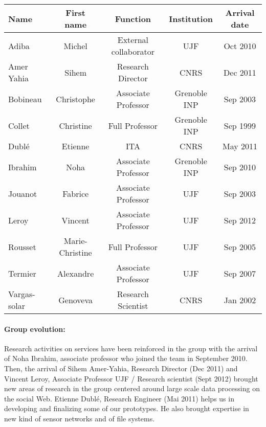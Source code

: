 
\begin{center}\begin{tabular}{|p{2.5cm}|*{4}{c|}}
\hline 
Name & First name & Function & Institution & Arrival date\\\hline \hline %
Adiba & Michel & External collaborator  & UJF & Oct 2010\\\hline
Amer Yahia & Sihem & Research Director & CNRS & Dec 2011  \\\hline
Bobineau & Christophe & Associate Professor & Grenoble INP & Sep 2003 \\\hline
Collet & Christine & Full Professor & Grenoble INP & Sep 1999 \\\hline
Dubl{\'e} & Etienne & ITA  & CNRS & May 2011\\\hline
Ibrahim & Noha & Associate Professor & Grenoble INP & Sep 2010  \\\hline
Jouanot & Fabrice & Associate Professor & UJF & Sep 2003 \\\hline
Leroy & Vincent & Associate Professor & UJF & Sep 2012 \\\hline
Rousset & Marie-Christine & Full Professor & UJF & Sep 2005 \\\hline
Termier & Alexandre & Associate Professor & UJF & Sep 2007 \\\hline
Vargas-solar & Genoveva & Research Scientist & CNRS & Jan 2002 \\\hline
\hline
\end{tabular}\end{center}
\makeatother


\paragraph{Group evolution:}
Research activities on services have been reinforced in the group with the arrival of Noha Ibrahim, associate professor who joined the team in September 2010. 
Then, the arrival of Sihem Amer-Yahia, Research Director (Dec 2011) and Vincent Leroy, Associate Professor UJF / Research scientist (Sept 2012) brought new areas of research in the group centered around large scale data processing on the social Web.
Etienne Dubl{\'e}, Research Engineer (Mai 2011) helps us in developing and finalizing some of our prototypes. He also brought expertise in new kind of sensor networks and of file systems. 

